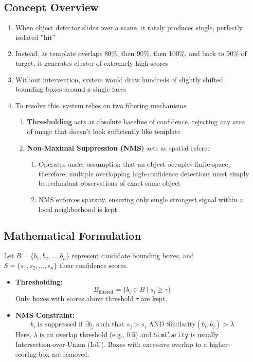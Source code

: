 \documentclass[12pt]{article}
\begin{document}
\subsection{Concept Overview}

\begin{enumerate}
    \item When object detector slides over a scane, it rarely produces single, perfectly isolated ''hit''
    \item Instead, as template overlaps 80\%, then 90\%, then 100\%, and back to 90\% of target, it generates cluster of extremely high scores
    \item Without intervention, system would draw hundreds of slightly shifted bounding boxes around a single faces
    \item To resolve this, system relies on two filtering mechanisms
          \begin{enumerate}
              \item \textbf{Thresholding} \- acts as absolute baseline of confidence, rejecting any area of image that doesn't look sufficiently like template
              \item \textbf{Non-Maximal Suppression (NMS)} \- acts as spatial referee
                    \begin{enumerate}
                        \item Operates under assumption that an object occupies finite space, therefore, multiple overlapping high-confidence detections must simply be redundant observations of exact same object
                        \item NMS enforces sparsity, ensuring only single strongest signal within a local neighborhood is kept
                    \end{enumerate}
          \end{enumerate}
\end{enumerate}


\subsection{Mathematical Formulation}
Let $B = \{b_1, b_2, \dots, b_n\}$ represent candidate bounding boxes, and $S = \{s_1, s_2, \dots, s_n\}$ their confidence scores.

\begin{itemize}
    \item \textbf{Thresholding:}
          \[
              B_{\text{filtered}} = \{b_i \in B \mid s_i \ge \tau\}
          \]
          Only boxes with scores above threshold $\tau$ are kept.

    \item \textbf{NMS Constraint:}
          \[
              b_i \text{ is suppressed if } \exists b_j \text{ such that } s_j > s_i \text{ AND } \text{Similarity}(b_i, b_j) > \lambda
          \]
          Here, $\lambda$ is an overlap threshold (e.g., 0.5) and \texttt{Similarity} is usually Intersection-over-Union (IoU). Boxes with excessive overlap to a higher-scoring box are removed.
\end{itemize}
\end{document}
